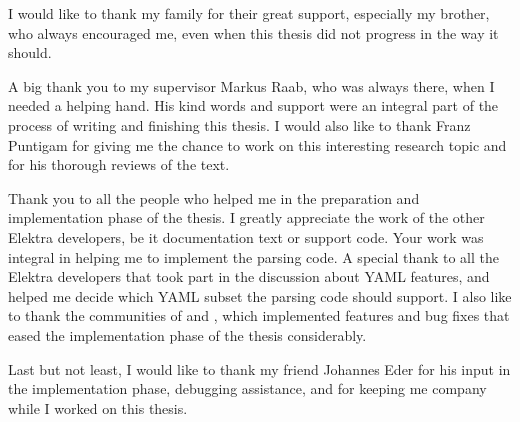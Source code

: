 \begin{acknowledgements*}
I would like to thank my family for their great support, especially my brother, who always encouraged me, even when this thesis did not progress in the way it should.

A big thank you to my supervisor Markus Raab, who was always there, when I needed a helping hand. His kind words and support were an integral part of the process of writing and finishing this thesis. I would also like to thank Franz Puntigam for giving me the chance to work on this interesting research topic and for his thorough reviews of the text.

Thank you to all the people who helped me in the preparation and implementation phase of the thesis. I greatly appreciate the work of the other Elektra developers, be it documentation text or support code. Your work was integral in helping me to implement the parsing code. A special thank to all the Elektra developers that took part in the discussion about YAML features, and helped me decide which YAML subset the parsing code should support. I also like to thank the communities of  and , which implemented features and bug fixes that eased the implementation phase of the thesis considerably.

Last but not least, I would like to thank my friend Johannes Eder for his input in the implementation phase, debugging assistance, and for keeping me company while I worked on this thesis.
\end{acknowledgements*}

